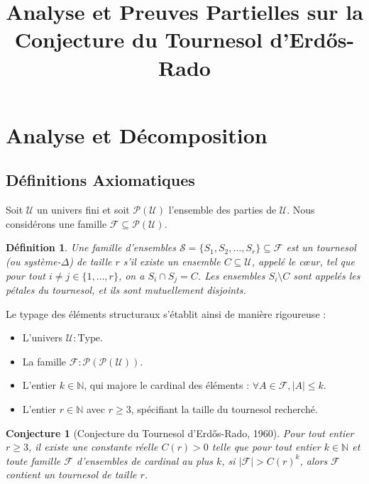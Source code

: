 \documentclass[12pt,a4paper]{article}
\title{Analyse et Preuves Partielles sur la Conjecture du Tournesol d'Erdős-Rado}
\author{}
\date{}
\newtheorem{definition}{Définition}
\newtheorem{conjecture}{Conjecture}
\begin{document}
\maketitle

\section{Analyse et Décomposition}

\subsection{Définitions Axiomatiques}

Soit $\mathcal{U}$ un univers fini et soit $\mathcal{P}(\mathcal{U})$ l'ensemble des parties de $\mathcal{U}$. Nous considérons une famille $\mathcal{F} \subseteq \mathcal{P}(\mathcal{U})$.

\begin{definition}
Une famille d'ensembles $\mathcal{S} = \{S_1, S_2, \dots, S_r\} \subseteq \mathcal{F}$ est un \emph{tournesol} (ou système-$\Delta$) de taille $r$ s'il existe un ensemble $C \subseteq \mathcal{U}$, appelé le \emph{cœur}, tel que pour tout $i \neq j \in \{1, \dots, r\}$, on a $S_i \cap S_j = C$. Les ensembles $S_i \setminus C$ sont appelés les pétales du tournesol, et ils sont mutuellement disjoints.
\end{definition}

Le typage des éléments structuraux s'établit ainsi de manière rigoureuse :
\begin{itemize}
    \item L'univers $\mathcal{U} : \mathrm{Type}$.
    \item La famille $\mathcal{F} : \mathcal{P}(\mathcal{P}(\mathcal{U}))$.
    \item L'entier $k \in \mathbb{N}$, qui majore le cardinal des éléments : $\forall A \in \mathcal{F}, |A| \le k$.
    \item L'entier $r \in \mathbb{N}$ avec $r \ge 3$, spécifiant la taille du tournesol recherché.
\end{itemize}

\begin{conjecture}[Conjecture du Tournesol d'Erdős-Rado, 1960]
Pour tout entier $r \ge 3$, il existe une constante réelle $C(r) > 0$ telle que pour tout entier $k \in \mathbb{N}$ et toute famille $\mathcal{F}$ d'ensembles de cardinal au plus $k$, si $|\mathcal{F}| > C(r)^k$, alors $\mathcal{F}$ contient un tournesol de taille $r$.
\end{conjecture}
\end{document}
